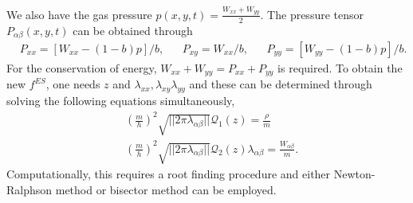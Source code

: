 \documentclass{rsproca}%
\begin{document}
We also have the gas pressure $p(x,y,t) = \frac{W_{xx} + W_{yy}}{2}$.  The pressure tensor $P_{\alpha \beta}(x,y,t)$ can be obtained through
\begin{align}
&P_{xx} = [W_{xx} - (1-b)p]/b,&  &P_{xy} = W_{xx}/b,&  &P_{yy} = [W_{yy} - (1-b)p]/b.&
\label{eq:pressure_tensor_variables}
\end{align}
For the conservation of energy, $W_{xx} +W_{yy} = P_{xx} + P_{yy}$ is required.
To obtain the new $f^{ES}$, one needs $z$ and $\lambda_{xx}, \lambda_{xy}\lambda_{yy}$ and these can be determined through solving the following equations simultaneously,
\begin{subequations}
\begin{align}
&(\frac{m}{h})^2 \sqrt{||2 \pi \lambda_{\alpha \beta} ||}\mathcal{Q}_{1}(z) = \frac{\rho}{m} \\
&(\frac{m}{h})^2 \sqrt{||2 \pi \lambda_{\alpha \beta} ||}\mathcal{Q}_{2}(z) \lambda_{\alpha \beta}= \frac{W_{\alpha \beta}}{m}.
\end{align}
\end{subequations}
Computationally, this requires a root finding procedure and either Newton-Ralphson method or bisector method can be employed.
\end{document}
